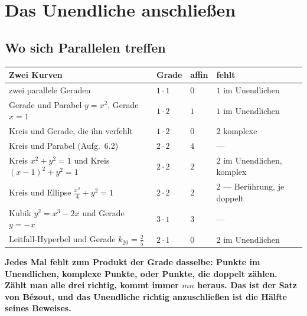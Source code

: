 \chapter{Das Unendliche anschließen}

\section{Wo sich Parallelen treffen}

\begin{merksatz}
\begin{center}
{\small
\renewcommand{\arraystretch}{1.5}
\begin{tabular}{@{}P{3.4cm}P{1.4cm}P{1.2cm}P{2.6cm}@{}}
\toprule
\textbf{Zwei Kurven} & \textbf{Grade} & \textbf{affin} & \textbf{fehlt}\\
\midrule
zwei parallele Geraden & $1\cdot1$ & $0$ & $1$ im Unendlichen\\
Gerade und Parabel $y = x^{2}$, Gerade $x = 1$ & $1\cdot2$ & $1$ & $1$ im Unendlichen\\
Kreis und Gerade, die ihn verfehlt & $1\cdot2$ & $0$ & $2$ komplexe\\
Kreis und Parabel (Aufg.\ 6.2) & $2\cdot2$ & $4$ & ---\\
Kreis $x^{2} + y^{2} = 1$ und Kreis $(x - 1)^{2} + y^{2} = 1$ & $2\cdot2$ & $2$ & $2$ im Unendlichen, komplex\\
Kreis und Ellipse $\tfrac{x^{2}}{4} + y^{2} = 1$ & $2\cdot2$ & $2$ & $2$ --- Berührung, je doppelt\\
Kubik $y^{2} = x^{3} - 2x$ und Gerade $y = -x$ & $3\cdot1$ & $3$ & ---\\
Leitfall-Hyperbel und Gerade $k_{20} = \tfrac25$ & $2\cdot1$ & $0$ & $2$ im Unendlichen\\
\bottomrule
\end{tabular}}
\end{center}

\begin{center}
\begin{minipage}{0.9\textwidth}
\textbf{Jedes Mal fehlt zum Produkt der Grade dasselbe: Punkte im Unendlichen, komplexe Punkte, oder Punkte, die doppelt zählen. Zählt man alle drei richtig, kommt immer $mn$ heraus. Das ist der Satz von Bézout, und das Unendliche richtig anzuschließen ist die Hälfte seines Beweises.}
\end{minipage}
\end{center}


\end{merksatz}
